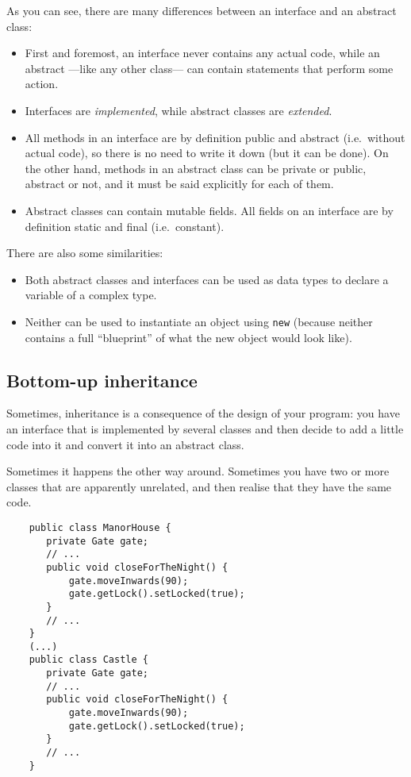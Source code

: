 As you can see, there are many differences between an interface and an
abstract class: 

\begin{itemize}
\item First and foremost, an interface never contains any actual code,
  while an abstract ---like any other class--- can contain statements
  that perform some action.
\item Interfaces are \emph{implemented}, while abstract classes are
  \emph{extended}.
\item All methods in an interface are by definition public and
  abstract (i.e.~without actual code), so there is no need to write it
  down (but it can be done). On the other hand, methods in an abstract
  class can be private or public, abstract or not, and it must be said
  explicitly for each of them.
\item Abstract classes can contain mutable fields. All fields on an
  interface are by definition static and final (i.e.~constant).
\end{itemize}

There are also some similarities: 

\begin{itemize}
\item Both abstract classes and interfaces can be used as data
  types to declare a variable of a complex type.
\item Neither can be used to instantiate an object using \verb+new+
  (because neither contains a full ``blueprint'' of what the new
  object would look like). 
\end{itemize}

\subsection{Bottom-up inheritance}
\label{sec:boot-up-inher}

Sometimes, inheritance is a consequence of the design of your
program: you have an interface that is implemented by several classes
and then decide to add a little code into it and convert it into an
abstract class. 

Sometimes it happens the other way around. Sometimes you have two or
more classes that are apparently unrelated, and then realise that they
have the same code. 

\begin{verbatim}
    public class ManorHouse {
       private Gate gate;
       // ...
       public void closeForTheNight() {
           gate.moveInwards(90);
           gate.getLock().setLocked(true);
       }
       // ...
    }
    (...)
    public class Castle {
       private Gate gate;
       // ...
       public void closeForTheNight() {
           gate.moveInwards(90);
           gate.getLock().setLocked(true);
       }
       // ...
    }       
\end{verbatim}

